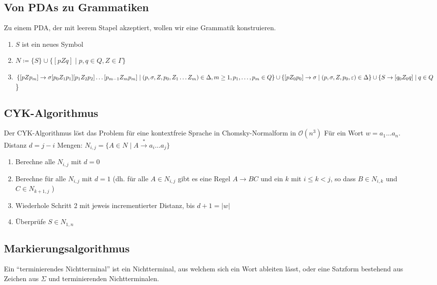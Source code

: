 \documentclass[11pt]{scrartcl}
\begin{document}
\subsection{Von PDAs zu Grammatiken}
Zu einem PDA, der mit leerem Stapel akzeptiert, wollen wir eine Grammatik konstruieren.

\begin{enumerate}
	\item $S$ ist ein neues Symbol
	\item $N \coloneqq \{S\} \cup \{[pZq] \mid p,q \in Q, Z \in \Gamma\}$
	\item $\{[pZp_m] \rightarrow \sigma[p_0Z_1p_1][p_1Z_2p_2]\ldots [p_{m-1}Z_mp_m] \mid \\ (p, \sigma, Z,p_0,Z_1\ldots Z_m) \in \Delta,  m \geq 1, p_1,\ldots,p_m \in Q\} \\ \cup \{[pZ_0p_0] \rightarrow \sigma \mid (p,\sigma,Z,p_0,\varepsilon) \in \Delta\} \\ \cup \{S \rightarrow [q_0Z_0q] \mid q \in Q$\}
\end{enumerate}

\subsection{CYK-Algorithmus}
Der CYK-Algorithmus löst das Problem für eine kontextfreie Sprache in Chomsky-Normalform in $\mathcal{O}(n^3)$
Für ein Wort $w = a_1\ldots a_n$. \\
Distanz $d = j-i$ Mengen: $N_{i,j} = \{A \in N\mid A \stackrel{\ast}{\rightarrow} a_i\ldots a_j\}$
\begin{enumerate}
	\item Berechne alle $N_{i,j}$ mit $d=0$
    \item Berechne für alle $N_{i,j}$ mit $d=1$ (dh. für alle $A \in N_{i,j}$ gibt es eine Regel $A \rightarrow BC$ und ein $k$ mit $i \leq k < j$, so dass $B \in N_{i,k}$ und $C \in N_{k+1,j}$ )
    \item Wiederhole Schritt 2 mit jeweis incrementierter Distanz, bis $d+1=|w|$
	\item Überprüfe $S \in N_{1,n}$
\end{enumerate}

\subsection{Markierungsalgorithmus}

Ein ``terminierendes Nichtterminal'' ist ein Nichtterminal, aus welchem sich ein Wort ableiten lässt, oder eine Satzform bestehend aus Zeichen aus $\Sigma$ und terminierenden Nichtterminalen. \\
\end{document}
